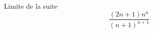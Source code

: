 Limite de la suite
\begin{displaymath}
 \frac{(2n+1)n^{n}}{(n+1)^{n+1}}
\end{displaymath}

\bigskip \bigskip
